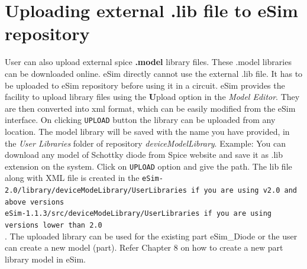 \section{Uploading external .lib file to eSim repository}
User can also upload external spice {\textbf{.model}} library files. These .model libraries can be downloaded online.  eSim directly cannot use the external .lib file. It has to be uploaded to eSim repository before using it in a circuit.
eSim provides the facility to upload library files using the {\textbf Upload} option in the {\textit 
{Model Editor}}. They are then converted into xml format, which can be easily modified from the eSim interface.
On clicking {\tt UPLOAD} button the library can be uploaded from any location. The model library will be saved with the name you have provided, in the \textit {User Libraries} folder of repository \textit{deviceModelLibrary}.
Example: You can download any model of Schottky diode from Spice website and save it as .lib extension on the system. Click on  {\tt UPLOAD} option and give the path. The lib file along with XML file is created in the {\tt eSim-2.0/library/deviceModeLibrary/UserLibraries if you are using v2.0 \linebreak and above versions \\
 eSim-1.1.3/src/deviceModeLibrary/UserLibraries if you are using \linebreak versions lower than 2.0 \\}. The uploaded library can be used for the existing part eSim\_Diode or the user can create a new model (part). Refer Chapter 8 on how to create a new part library model in eSim.
